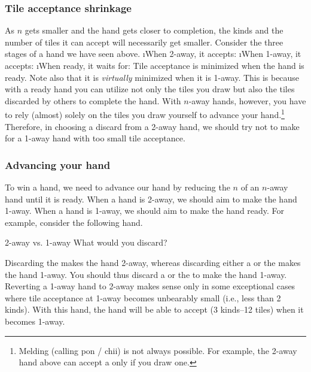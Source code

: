 \subsubsection{Tile acceptance shrinkage} 
As $n$ gets smaller and the hand gets closer to completion, the kinds and the number of tiles it can accept will necessarily get smaller. Consider the three stages of a hand we have seen above.
\bi
\i When 2-away, it accepts: {\large{}}
\i When 1-away, it accepts: {\large{}}
\i When ready, it waits for: {\large{}}
\ei
Tile acceptance is minimized when the hand is ready. Note also that it is \emph{virtually} minimized when it is 1-away. This is because with a ready hand you can utilize not only the tiles you draw but also the tiles discarded by others to complete the hand. With $n$-away hands, however, you have to rely (almost) solely on the tiles you draw yourself to advance your hand.\footnote{Melding (calling {\jap pon} / {\jap chii}) is not always possible. For example, the 2-away hand above can accept a  only if you draw one.} 
Therefore, in choosing a discard from a 2-away hand, we should try not to make for a 1-away hand with too small tile acceptance.

\subsubsection{Advancing your hand}

To win a hand, we need to advance our hand by reducing the $n$ of an $n$-away hand until it is ready.
When a hand is 2-away, we should aim to make the hand 1-away. 
When a hand is 1-away, we should aim to make the hand ready. 
For example, consider the following hand. 
\begin{itembox}[r]{2-away vs. 1-away}
\bp
{}\fa\fa\fa
\ep
\vspace{-10pt}What would you discard? \vspace{-5pt}
\end{itembox}
\noindent
Discarding the {\large{}} makes the hand 2-away, whereas discarding either a {\large{}} or the {\large{}} makes the hand 1-away. You should thus discard a {\large{}} or the {\large{}} to make the hand 1-away. 
Reverting a 1-away hand to 2-away makes sense only in some exceptional cases where tile acceptance at 1-away becomes unbearably small (i.e., less than 2 kinds).
With this hand, the hand will be able to accept {\large{}} (3 kinds--12 tiles) when it becomes 1-away.

